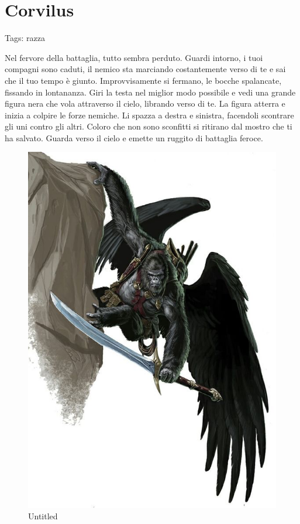 \section{Corvilus}\label{corvilus}

Tags: razza

Nel fervore della battaglia, tutto sembra perduto. Guardi intorno, i
tuoi compagni sono caduti, il nemico sta marciando costantemente verso
di te e sai che il tuo tempo è giunto. Improvvisamente si fermano, le
bocche spalancate, fissando in lontananza. Giri la testa nel miglior
modo possibile e vedi una grande figura nera che vola attraverso il
cielo, librando verso di te. La figura atterra e inizia a colpire le
forze nemiche. Li spazza a destra e sinistra, facendoli scontrare gli
uni contro gli altri. Coloro che non sono sconfitti si ritirano dal
mostro che ti ha salvato. Guarda verso il cielo e emette un ruggito di
battaglia feroce.

\begin{figure}
\centering
\includegraphics{Untitled 1.png}
\caption{Untitled}
\end{figure}

